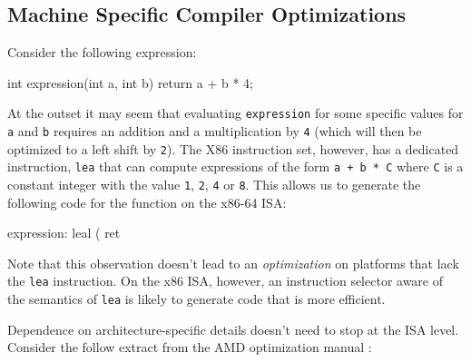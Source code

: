 \subsection{Machine Specific Compiler Optimizations}

Consider the following expression:

\begin{ccode}
int expression(int a, int b) {
  return a + b * 4;
}
\end{ccode}

At the outset it may seem that evaluating \texttt{expression} for some
specific values for \texttt{a} and \texttt{b} requires an addition and
a multiplication by \texttt{4} (which will then be optimized to a left
shift by \texttt{2}).  The X86 instruction set, however, has a
dedicated instruction, \texttt{lea} that can compute expressions of
the form \texttt{a + b * C} where \texttt{C} is a constant integer
with the value \texttt{1}, \texttt{2}, \texttt{4} or \texttt{8}.  This
allows us to generate the following code for the function on the
x86-64 ISA:

\begin{gascode}
expression:
  leal (%
  ret
\end{gascode}

Note that this observation doesn't lead to an \textit{optimization} on
platforms that lack the \texttt{lea} instruction.  On the x86 ISA,
however, an instruction selector aware of the semantics of
\texttt{lea} is likely to generate code that is more efficient.

Dependence on architecture-specific details doesn't need to stop at
the ISA level.  Consider the follow extract from the AMD optimization
manual \cite[Section ~6.2]{amd64opt}:

